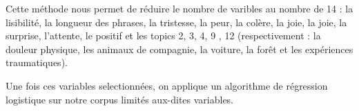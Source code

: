 \documentclass[12pt,a4paper,oneside,titlepage]{book} %
\begin{document}
Cette méthode nous permet de réduire le nombre de varibles au nombre de  14 : la lisibilité, la longueur des phrases, la tristesse, la peur, la colère, la joie, la joie, la surprise, l'attente, le positif et les topics 2, 3, 4, 9 , 12 (respectivement  : la douleur physique, les animaux de compagnie, la voiture, la forêt et les expériences traumatiques). 

Une fois ces variables selectionnées, on applique un algorithme de régression logistique sur notre corpus limités aux-dites variables.
\end{document}
